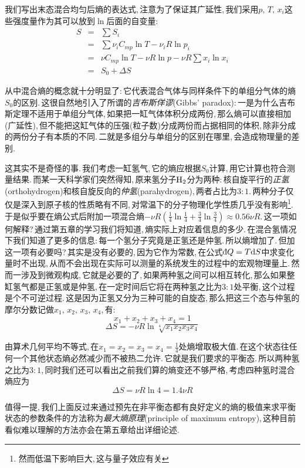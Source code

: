 我们写出末态混合均匀后熵的表达式,\,注意为了保证其广延性,\,我们采用$p,\,T,\,x_i$这些强度量作为其可以放到$\ln$后面的自变量:
\begin{eqnarray*}
S 	&=&	 \sum S_i \\
	&=&	\sum \nu_i C_{mp}\ln T-\nu_i R\ln p_i \\
	&=&	\nu C_{mp}\ln T-\nu R\ln p-\nu R\sum x_i\ln x_i \\
	&=&	S_0 +\Delta S
\end{eqnarray*}

从中混合熵的概念就十分明显了:\,它代表混合气体与同样条件下的单组分气体的熵$S_0$的区别.\,这很自然地引入了所谓的\emph{吉布斯佯谬}(Gibbs' paradox):\,一是为什么吉布斯定理不适用于单组分气体,\,如果把一缸气体体积分成两份,\,那么熵可以直接相加(广延性),\,但不能把这缸气体的压强(粒子数)分成两份而占据相同的体积,\,除非分成的两份分子有本质的不同.\,二就是多组分与单组分的区别在哪里,\,会造成物理量的差别.

这其实不是奇怪的事.\,我们考虑一缸氢气,\,它的熵应根据$S_0$计算,\,用它计算也符合测量结果.\,而某一天科学家们突然得知,\,原来氢分子${\rm H_2}$分为两种:\,核自旋平行的\emph{正氢}(orthohydrogen)和核自旋反向的\emph{仲氢}(parahydrogen),\,两者占比为$3:1$.\,两种分子仅仅是深入到原子核的性质略有不同,\,对常温下的分子物理化学性质几乎没有影响\footnote{然而低温下影响巨大,\,这与量子效应有关}.\,于是似乎要在熵公式后附加一项混合熵$\displaystyle -\nu R(\frac{1}{4}\ln\frac{1}{4}+\frac{3}{4}\ln\frac{3}{4})\approx 0.56\nu R$.\,这一项如何解释?\,通过第五章的学习我们将知道,\,熵实际上对应着信息的多少.\,在混合氢情况下我们知道了更多的信息:\,每一个氢分子究竟是正氢还是仲氢.\,所以熵增加了.\,但加这一项有必要吗?\,其实是没有必要的,\,因为它作为常数,\,在公式$\dbar Q=T\ud S$中求变化量时不出现,\,从而不会出现在实际可以测量的系统发生的过程中的宏观物理量上.\,然而一涉及到微观构成,\,它就是必要的了,\,如果两种氢之间可以相互转化,\,那么如果整缸氢气都是正氢或是仲氢,\,在一定时间后它将在两种氢之比为$3:1$处平衡,\,这个过程是个不可逆过程.\,这是因为正氢又分为三种可能的自旋态,\,那么把这三个态与仲氢的摩尔分数记做$x_1,\,x_2,\,x_3,\,x_4$,\,有:
\[x_1+x_2+x_3+x_4=1\]
\[\Delta S=-\nu R\ln\sqrt[4]{x_1x_2x_3x_4}\]

由算术几何平均不等式,\,在$\displaystyle x_1=x_2=x_3=x_4=\frac{1}{4}$处熵增取极大值.\,在这个状态往任何一个其他状态熵必然减少而不被热二允许.\,它就是我们要求的平衡态.\,所以两种氢之比为$3:1$,\,同时我们还可以看出之前我们算的熵变还不够严格,\,考虑四种氢时混合熵应为
\[\Delta S=\nu R\ln 4=1.4\nu R\]

值得一提,\,我们上面反过来通过预先在非平衡态都有良好定义的熵的极值来求平衡状态的参数条件的方法称为\emph{最大熵原理}(principle of maximum entropy),\,这种目前看似难以理解的方法亦会在第五章给出详细论述.




